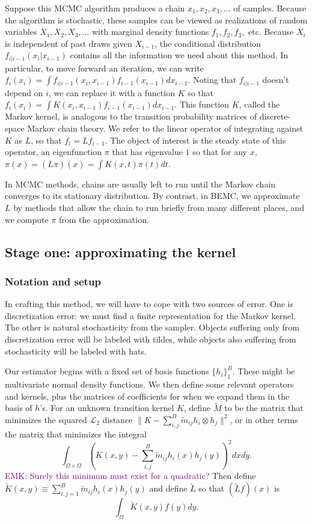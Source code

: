 \documentclass{article}
\newcommand\EMK[1]{\textcolor{purple}{EMK: #1}}
\begin{document}
Suppose this MCMC algorithm produces a chain $ x_1, x_2, x_3, ...$ of samples. Because the algorithm is stochastic, these samples can be viewed as realizations of random variables $X_1, X_2, X_3, ...$ with marginal density functions $f_1, f_2, f_3, $ etc. Because $X_i$ is independent of past draws given $X_{i-1}$, the conditional distribution $f_{i|i-1}(x_i|x_{i-1})$ contains all the information we need about this method. In particular, to move forward an iteration, we can write $f_i(x_i) = \int f_{i|i-1}(x_{i},x_{i-1})f_{i-1}(x_{i-1})dx_{i-1}$. Noting that $f_{i|i-1}$ doesn't depend on $i$, we can replace it with a function $K$ so that $f_i(x_i) = \int K(x_i, x_{i-1})f_{i-1}(x_{i-1})dx_{i-1}$. This function $K$, called the Markov kernel, is analogous to the transition probability matrices of discrete-space Markov chain theory. We refer to the linear operator of integrating against $K$ as $L$, so that $f_{i} = Lf_{i-1}$. The object of interest is the steady state of this operator, an eigenfunction $\pi$ that has eigenvalue $1$ so that for any $x$, $\pi(x) = (L\pi)(x) = \int K(x, t)\pi(t)dt$. 

In MCMC methods, chains are usually left to run until the Markov chain converges to its stationary distribution. By contrast, in BEMC, we approximate $L$ by methods that allow the chain to run briefly from many different places, and we compute $\pi$ from the approximation. 

\subsection{Stage one: approximating the kernel}
\label{sec:BEMC}

\subsubsection{Notation and setup}

In crafting this method, we will have to cope with two sources of error. One is discretization error: we must find a finite representation for the Markov kernel. The other is natural stochasticity from the sampler. Objects suffering only from discretization error will be labeled with tildes, while objects also suffering from stochasticity will be labeled with hats.

Our estimator begins with a fixed set of basis functions $\{h_i\}_1^B$. These might be multivariate normal density functions. We then define some relevant operators and kernels, plus the matrices of coefficients for when we expand them in the basis of $h$'s. For an unknown transition kernel $K$, define $\tilde{M}$ to be the matrix that minimizes the squared $\mathcal{L}_2$ distance $\|K - \sum_{i,j}^B\tilde{m}_{ij} h_i \otimes h_j\|^2$, or in other terms the matrix that minimizes the integral $$\int_{\Omega\times\Omega}(K(x,y) - \sum_{i,j}^B\tilde{m}_{ij} h_i(x)h_j(y))^2dx dy .$$ \EMK{Surely this minimum must exist for a quadratic?} Then define $\tilde{K}(x,y) \equiv \sum_{i,j=1}^B \tilde{m}_{ij} h_i(x)h_j(y)$ and define $\tilde{L}$ so that $(\tilde{L}f)(x)$ is $$\int_{\Omega}\tilde{K}(x,y)f(y)dy.$$
\end{document}
